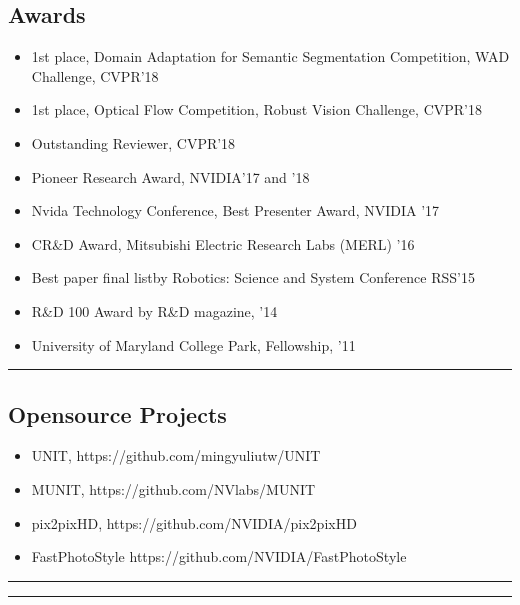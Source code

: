 \documentclass[10pt,letterpaper]{article}
\begin{document}
\subsection*{Awards}
\begin{itemize}
\item 1st place, Domain Adaptation for Semantic Segmentation Competition, WAD Challenge, CVPR'18\vspace{-2mm}
\item 1st place, Optical Flow Competition, Robust Vision Challenge, CVPR'18\vspace{-2mm}
\item Outstanding Reviewer, CVPR'18\vspace{-2mm}
\item Pioneer Research Award, NVIDIA'17 and '18\vspace{-2mm}
\item Nvida Technology Conference, Best Presenter Award, NVIDIA '17\vspace{-2mm}
\item CR\&D Award, Mitsubishi Electric Research Labs (MERL) '16\vspace{-2mm}
\item Best paper final listby Robotics: Science and System Conference RSS'15\vspace{-2mm}
\item R\&D 100 Award by R\&D magazine, '14\vspace{-2mm}
\item University of Maryland College Park, Fellowship, '11
\end{itemize}
\hrule
\subsection*{Opensource Projects}
\begin{itemize}
	\item UNIT, https://github.com/mingyuliutw/UNIT\vspace{-2mm}
	\item MUNIT, https://github.com/NVlabs/MUNIT\vspace{-2mm}
	\item pix2pixHD, https://github.com/NVIDIA/pix2pixHD\vspace{-2mm}
	\item FastPhotoStyle https://github.com/NVIDIA/FastPhotoStyle\vspace{-2mm}
\end{itemize}
\hrule


\hrule
\end{document}
